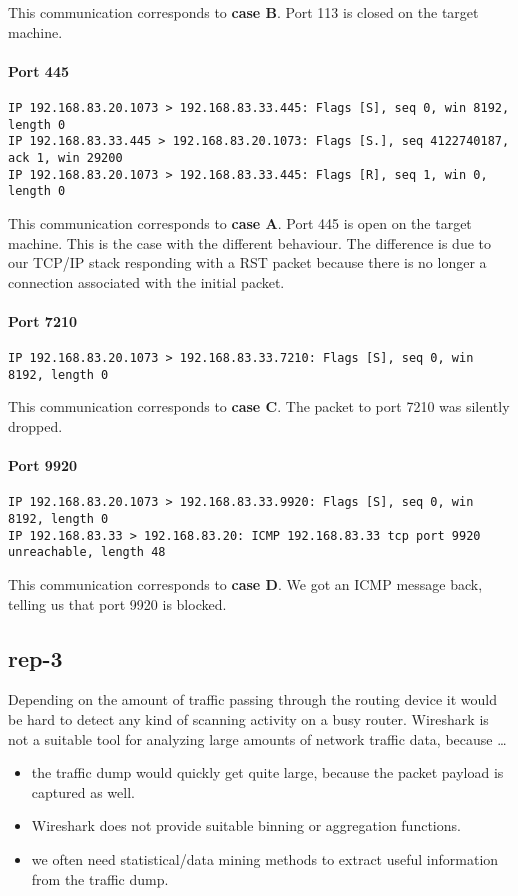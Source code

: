 \documentclass{article}
\begin{document}
This communication corresponds to \textbf{case B}. Port 113 is closed on the target machine.

\paragraph{Port 445}
\begin{Verbatim}
IP 192.168.83.20.1073 > 192.168.83.33.445: Flags [S], seq 0, win 8192, length 0
IP 192.168.83.33.445 > 192.168.83.20.1073: Flags [S.], seq 4122740187, ack 1, win 29200
IP 192.168.83.20.1073 > 192.168.83.33.445: Flags [R], seq 1, win 0, length 0
\end{Verbatim}

This communication corresponds to \textbf{case A}. Port 445 is open on the target machine. This
is the case with the different behaviour. The difference is due to our TCP/IP stack responding with
a RST packet because there is no longer a connection associated with the initial packet.

\paragraph{Port 7210}
\begin{Verbatim}
IP 192.168.83.20.1073 > 192.168.83.33.7210: Flags [S], seq 0, win 8192, length 0
\end{Verbatim}

This communication corresponds to \textbf{case C}. The packet to port 7210 was silently dropped.

\paragraph{Port 9920}
\begin{Verbatim}
IP 192.168.83.20.1073 > 192.168.83.33.9920: Flags [S], seq 0, win 8192, length 0
IP 192.168.83.33 > 192.168.83.20: ICMP 192.168.83.33 tcp port 9920 unreachable, length 48
\end{Verbatim}

This communication corresponds to \textbf{case D}. We got an ICMP message back, telling us that port 9920
is blocked.

\subsection{rep-3}

Depending on the amount of traffic passing through the routing device it would be hard to
detect any kind of scanning activity on a busy router. Wireshark is not a suitable tool for analyzing
large amounts of network traffic data, because \ldots
\begin{itemize}
    \item the traffic dump would quickly get quite large, because the packet payload is captured as well.
    \item Wireshark does not provide suitable binning or aggregation functions.
    \item we often need statistical/data mining methods to extract useful information from the traffic dump.
\end{itemize}
\end{document}
